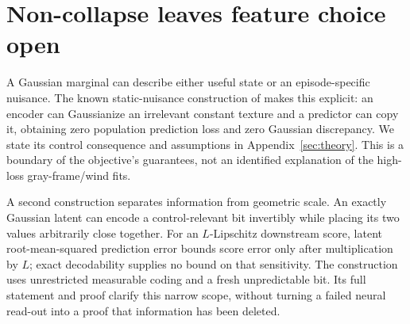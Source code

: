 \section{Non-collapse leaves feature choice open}
\label{sec:theory-summary}

A Gaussian marginal can describe either useful state or an episode-specific nuisance. The known
static-nuisance construction of \citet{sobal2022slow} makes this explicit: an encoder can Gaussianize
an irrelevant constant texture and a predictor can copy it, obtaining zero population prediction
loss and zero Gaussian discrepancy. We state its control consequence and assumptions in
Appendix~\ref{sec:theory}. This is a boundary of the objective's guarantees, not an identified
explanation of the high-loss gray-frame/wind fits.

A second construction separates information from geometric scale. An exactly Gaussian latent can
encode a control-relevant bit invertibly while placing its two values arbitrarily close together.
For an $L$-Lipschitz downstream score, latent root-mean-squared prediction error bounds score error
only after multiplication by $L$; exact decodability supplies no bound on that sensitivity. The
construction uses unrestricted measurable coding and a fresh unpredictable bit. Its full statement
and proof clarify this narrow scope, without turning a failed neural read-out into a proof that
information has been deleted.
